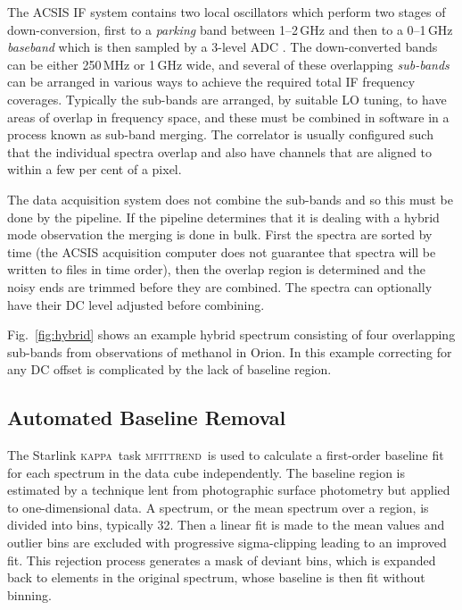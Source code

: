 \documentclass[a4paper,fleqn,usenatbib]{mnras}
\newcommand{\KAPPA}{\textsc{kappa}}
\newcommand{\mfittrend}{\textsc{mfittrend}}
\begin{document}
The ACSIS IF system contains two local oscillators which perform two
stages of down-conversion, first to a \emph{parking} band between
1--2\,GHz and then to a 0--1\,GHz \emph{baseband} which is then sampled
by a 3-level ADC \citep{2000SPIE.4015..114H}. The down-converted bands
can be either 250\,MHz or 1\,GHz wide, and several of these
overlapping \emph{sub-bands} can be arranged in various ways to
achieve the required total IF frequency coverages. Typically the
sub-bands are arranged, by suitable LO tuning, to have areas of
overlap in frequency space, and these must be combined in software in
a process known as sub-band merging. The correlator is usually
configured such that the individual spectra overlap and also have
channels that are aligned to within a few per cent of a pixel.

The data acquisition system does not combine the sub-bands and so this
must be done by the pipeline. If the pipeline determines that it is
dealing with a hybrid mode observation the merging is done in
bulk. First the spectra are sorted by time (the ACSIS acquisition
computer does not guarantee that spectra will be written to files in
time order), then the overlap region is determined and the noisy ends
are trimmed before they are combined. The spectra can optionally have
their DC level adjusted before combining.

Fig.\ \ref{fig:hybrid} shows an example hybrid spectrum consisting of
four overlapping sub-bands from observations of methanol in Orion. In this
example correcting for any DC offset is complicated by the lack of
baseline region.

\subsection{Automated Baseline Removal}
\label{sec:mfittrend}

The Starlink \KAPPA\ task \mfittrend\ is used to calculate a
first-order baseline fit for each spectrum in the data cube
independently. The baseline region is estimated by a technique lent
from photographic surface photometry \citep{1998A&AS..127..367Y} but applied to one-dimensional
data.  A spectrum, or the mean spectrum over a region, is divided into
bins, typically 32.  Then a linear fit is made to the mean values and
outlier bins are excluded with progressive sigma-clipping leading to
an improved fit.  This rejection process generates a mask of deviant
bins, which is expanded back to elements in the original spectrum,
whose baseline is then fit without binning.
\end{document}
